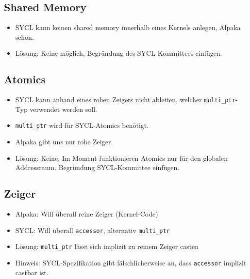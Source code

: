 \subsection{Shared Memory}

\begin{itemize}
    \item SYCL kann keinen shared memory innerhalb eines Kernels anlegen, Alpaka
          schon.
    \item Lösung: Keine möglich, Begründung des SYCL-Kommittees einfügen.
\end{itemize}

\subsection{Atomics}

\begin{itemize}
    \item SYCL kann anhand eines rohen Zeigers nicht ableiten, welcher
          \texttt{multi\_ptr}-Typ verwendet werden soll.
    \item \texttt{multi\_ptr} wird für SYCL-Atomics benötigt.
    \item Alpaka gibt uns nur rohe Zeiger.
    \item Lösung: Keine. Im Moment funktionieren Atomics nur für den globalen
          Addressraum. Begründung SYCL-Kommittee einfügen.
\end{itemize}

\subsection{Zeiger}

\begin{itemize}
    \item Alpaka: Will überall reine Zeiger (Kernel-Code)
    \item SYCL: Will überall \texttt{accessor}, alternativ \texttt{multi\_ptr}
    \item Lösung: \texttt{multi\_ptr} lässt sich implizit zu reinem Zeiger casten
    \item Hinweis: SYCL-Spezifikation gibt fälschlicherweise an, dass
          \texttt{accessor} implizit castbar ist.
\end{itemize}
